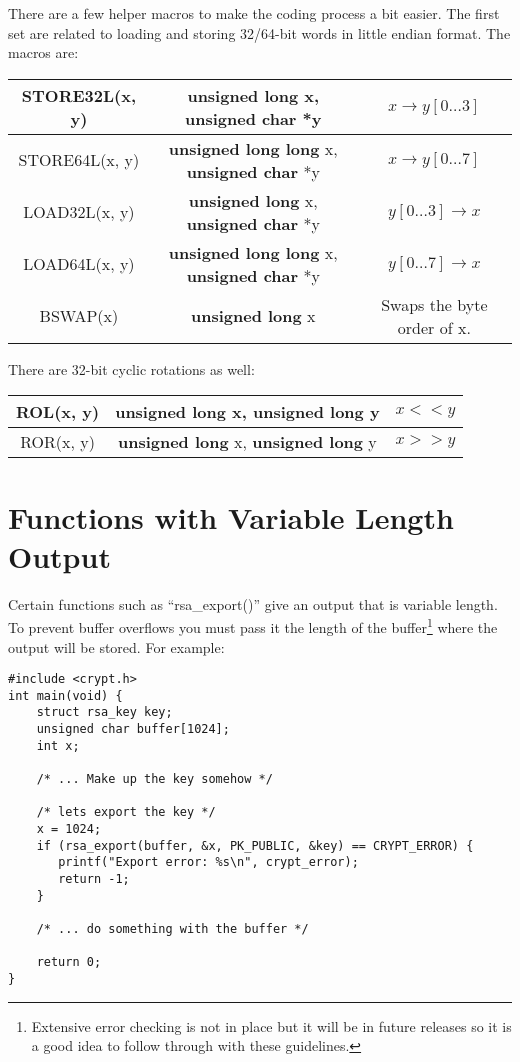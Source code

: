 \documentclass{book}
\begin{document}
There are a few helper macros to make the coding process a bit easier.  The first set are related to loading and storing
32/64-bit words in little endian format.  The macros are:

\begin{center}
\begin{tabular}{|c|c|c|}
     \hline STORE32L(x, y) & {\bf unsigned long} x, {\bf unsigned char} *y & $x \to y[0 \ldots 3]$ \\
     \hline STORE64L(x, y) & {\bf unsigned long long} x, {\bf unsigned char} *y & $x \to y[0 \ldots 7]$ \\
     \hline LOAD32L(x, y) & {\bf unsigned long} x, {\bf unsigned char} *y & $y[0 \ldots 3] \to x$ \\
     \hline LOAD64L(x, y) & {\bf unsigned long long} x, {\bf unsigned char} *y & $y[0 \ldots 7] \to x$ \\
     \hline BSWAP(x) & {\bf unsigned long} x & Swaps the byte order of x. \\
     \hline
\end{tabular}
\end{center}

There are 32-bit cyclic rotations as well:
\begin{center}
\begin{tabular}{|c|c|c|}
     \hline ROL(x, y) & {\bf unsigned long} x, {\bf unsigned long} y & $x << y$ \\
     \hline ROR(x, y) & {\bf unsigned long} x, {\bf unsigned long} y & $x >> y$ \\
     \hline
\end{tabular}
\end{center}

\section{Functions with Variable Length Output}
Certain functions such as ``rsa\_export()'' give an output that is variable length.  To prevent buffer overflows you
must pass it the length of the buffer\footnote{Extensive error checking is not in place but it will be in future releases so it is a good idea to follow through with these guidelines.} where
the output will be stored.  For example:

\begin{verbatim}
#include <crypt.h>
int main(void) {
    struct rsa_key key;
    unsigned char buffer[1024];
    int x;

    /* ... Make up the key somehow */

    /* lets export the key */ 
    x = 1024; 
    if (rsa_export(buffer, &x, PK_PUBLIC, &key) == CRYPT_ERROR) {
       printf("Export error: %s\n", crypt_error);
       return -1;
    }

    /* ... do something with the buffer */
    
    return 0;
}
\end{verbatim}
\end{document}
